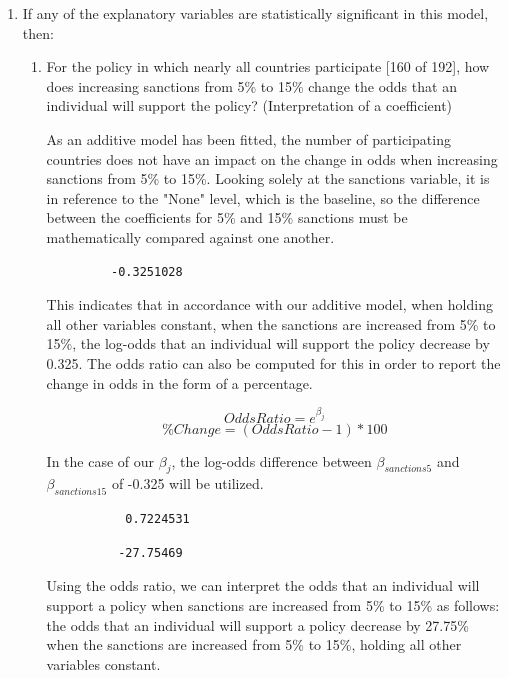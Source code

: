 \documentclass[12pt,letterpaper]{article}
\begin{document}
\begin{enumerate}
\item
If any of the explanatory variables are statistically significant in this model, then:
\begin{enumerate}
	\item
	For the policy in which nearly all countries participate [160 of 192], how does increasing sanctions from 5\% to 15\% change the odds that an individual will support the policy? (Interpretation of a coefficient)
	\vspace{.25cm}
		
	\noindent As an additive model has been fitted, the number of participating countries does not have an impact on the change in odds when increasing sanctions from 5\% to 15\%. Looking solely at the sanctions variable, it is in reference to the "None" level, which is the baseline, so the difference between the coefficients for 5\% and 15\% sanctions must be mathematically compared against one another.
		
	

	\begin{verbatim}
		 -0.3251028
	\end{verbatim}
			
	\noindent This indicates that in accordance with our additive model, when holding all other variables constant, when the sanctions are increased from 5\% to 15\%, the log-odds that an individual will support the policy decrease by 0.325. The odds ratio can also be computed for this in order to report the change in odds in the form of a percentage.
	
	\[Odds Ratio = e^{\beta_{j}}\]
	\[\% Change = (Odds Ratio - 1) * 100\]
	 
	\noindent In the case of our $\beta_{j}$, the log-odds difference between $\beta_{sanctions5}$ and $\beta_{sanctions15}$ of -0.325 will be utilized.
	
	
	
	\begin{verbatim}
		   0.7224531 
	\end{verbatim}
	
	
	
	\begin{verbatim}
		  -27.75469
	\end{verbatim}
	
	\noindent Using the odds ratio, we can interpret the odds that an individual will support a policy when sanctions are increased from 5\% to 15\% as follows: the odds that an individual will support a policy decrease by 27.75\% when the sanctions are increased from 5\% to 15\%, holding all other variables constant.
	\vspace{.25cm}
		

\end{enumerate}
\end{enumerate}
\end{document}
